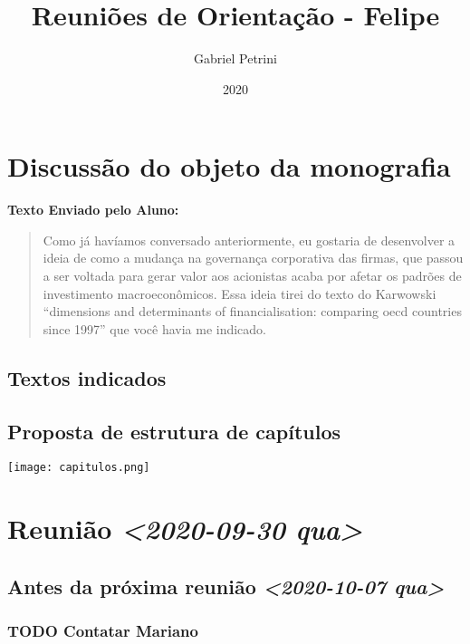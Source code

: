 \documentclass[11pt]{article}
\author{Gabriel Petrini}
\date{2020}
\title{Reuniões de Orientação - Felipe}
\begin{document}
\maketitle
\tableofcontents


\section*{Discussão do objeto da monografia}
\label{sec:org8e5cb8f}

\textbf{Texto Enviado pelo Aluno:}

\begin{quote}
Como já havíamos conversado anteriormente, eu gostaria de desenvolver a ideia de como a mudança na governança corporativa das firmas, que passou a ser voltada para gerar valor aos acionistas acaba por afetar os padrões de investimento macroeconômicos. Essa ideia tirei do texto do Karwowski “dimensions and determinants of financialisation: comparing oecd countries since 1997” que você havia me indicado.
\end{quote}



\subsection*{Textos indicados}
\label{sec:orgf663b19}


\subsection*{Proposta de estrutura de capítulos}
\label{sec:org601ab3b}

\begin{center}
\texttt{[image: capitulos.png]}
\end{center}

\section*{Reunião \textit{<2020-09-30 qua>}}
\label{sec:org617a020}

\subsection*{Antes da próxima reunião \textit{<2020-10-07 qua>}}
\label{sec:orgd4bbcf6}

\subsubsection*{{\bfseries\sffamily TODO} Contatar Mariano}
\label{sec:orge9f02d6}
\end{document}
